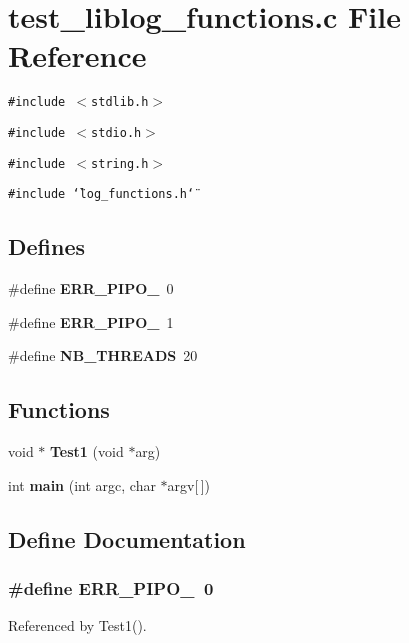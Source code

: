 \section{test\_\-liblog\_\-functions.c File Reference}
\label{test__liblog__functions_8c}
{\tt \#include $<$stdlib.h$>$}\par
{\tt \#include $<$stdio.h$>$}\par
{\tt \#include $<$string.h$>$}\par
{\tt \#include \char`\"{}log\_\-functions.h\char`\"{}}\par
\subsection*{Defines}
\begin{CompactItemize}
\item 
\#define {\bf ERR\_\-PIPO\_}\ 0
\item 
\#define {\bf ERR\_\-PIPO\_}\ 1
\item 
\#define {\bf NB\_\-THREADS}\ 20
\end{CompactItemize}
\subsection*{Functions}
\begin{CompactItemize}
\item 
void $\ast$ {\bf Test1} (void $\ast$arg)
\item 
int {\bf main} (int argc, char $\ast$argv[$\,$])
\end{CompactItemize}


\subsection{Define Documentation}
\subsubsection{\setlength{\rightskip}{0pt plus 5cm}\#define ERR\_\-PIPO\_\ 0}\label{test__liblog__functions_8c_a0}




Referenced by Test1().
